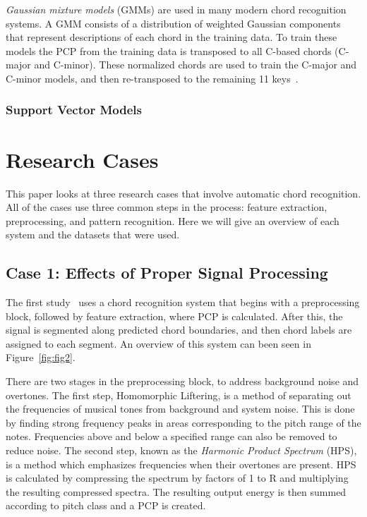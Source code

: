 \documentclass{sig-alternate}
\begin{document}
\textit{Gaussian mixture models} (GMMs) are used in many modern chord recognition systems. A GMM consists of a distribution of weighted Gaussian components that represent descriptions of each chord in the training data. To train these models the PCP from the training data is transposed to all C-based chords (C-major and C-minor). These normalized chords are used to train the C-major and C-minor models, and then re-transposed to the remaining 11 keys~\cite{TaeMin:2014}.


\subsubsection{Support Vector Models}

\section{Research Cases}

This paper looks at three research cases that involve automatic chord recognition. All of the cases use three common steps in the process: feature extraction, preprocessing, and pattern recognition. Here we will give an overview of each system and the datasets that were used.


\subsection{Case 1: Effects of Proper Signal Processing}

The first study~\cite{Morman:2006} uses a chord recognition system that begins with a preprocessing block, followed by feature extraction, where PCP is calculated. After this, the signal is segmented along predicted chord boundaries, and then chord labels are assigned to each segment. An overview of this system can been seen in Figure~\ref{fig:fig2}. 

There are two stages in the preprocessing block, to address background noise and overtones. The first step, Homomorphic Liftering, is a method of separating out the frequencies of musical tones from background and system noise. This is done by finding strong frequency peaks in areas corresponding to the pitch range of the notes. Frequencies above and below a specified range can also be removed to reduce noise. The second step, known as the \textit{Harmonic Product Spectrum} (HPS), is a method which emphasizes frequencies when their overtones are present. HPS is calculated by compressing the spectrum by factors of 1 to R and multiplying the resulting compressed spectra. The resulting output energy is then summed according to pitch class and a PCP is created.
\end{document}
